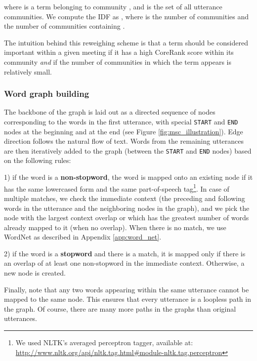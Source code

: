 \documentclass[11pt,a4paper]{article}
\begin{document}
\vspace{-0.75cm}



where  is a term belonging to community , and  is the set of all utterance communities. We compute the IDF as , where  is the number of communities and   the number of communities containing .

The intuition behind this reweighing scheme is that a term should be considered important within a given meeting if it has a high CoreRank score within its community \textit{and} if the number of communities in which the term appears is relatively small.

\subsubsection*{Word graph building}
The backbone of the graph is laid out as a directed sequence of nodes corresponding to the words in the first utterance, with special \texttt{START} and \texttt{END} nodes at the beginning and at the end (see Figure \ref{fig:msc_illustration}). Edge direction follows the natural flow of text. Words from the remaining utterances are then iteratively added to the graph (between the \texttt{START} and \texttt{END} nodes) based on the following rules:\\

\vspace{-0.2cm}

1) if the word is a \textbf{non-stopword}, the word is mapped onto an existing node if it has the same lowercased form and the same part-of-speech tag\footnote{\tiny{We used NLTK's averaged perceptron tagger, available at: \url{http://www.nltk.org/api/nltk.tag.html\#module-nltk.tag.perceptron}}}. In case of multiple matches, we check the immediate context (the preceding and following words in the utterance and the neighboring nodes in the graph), and we pick the node with the largest context overlap or which has the greatest number of words already mapped to it (when no overlap). When there is no match, we use WordNet as described in Appendix \ref{app:word_net}.

2) if the word is a \textbf{stopword} and there is a match, it is mapped only if there is an overlap of at least one non-stopword in the immediate context. Otherwise, a new node is created.\\

\vspace{-0.35cm}

\noindent Finally, note that any two words appearing within the same utterance cannot be mapped to the same node. This ensures that every utterance is a loopless path in the graph. Of course, there are many more paths in the graphs than original utterances.
\end{document}

